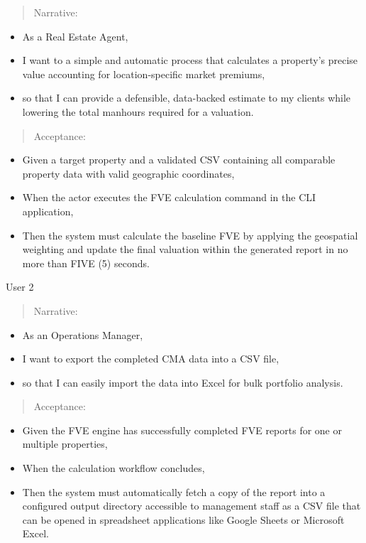 \begin{quote}
Narrative:
\end{quote}

\begin{itemize}
\item
  As a Real Estate Agent,
\item
  I want to a simple and automatic process that calculates a property's
  precise value accounting for location-specific market premiums,
\item
  so that I can provide a defensible, data-backed estimate to my clients
  while lowering the total manhours required for a valuation.
\end{itemize}

\begin{quote}
Acceptance:
\end{quote}

\begin{itemize}
\item
  Given a target property and a validated CSV containing all comparable
  property data with valid geographic coordinates,
\item
  When the actor executes the FVE calculation command in the CLI
  application,
\item
  Then the system must calculate the baseline FVE by applying the
  geospatial weighting and update the final valuation within the
  generated report in no more than FIVE (5) seconds.
\end{itemize}

User 2

\begin{quote}
Narrative:
\end{quote}

\begin{itemize}
\item
  As an Operations Manager,
\item
  I want to export the completed CMA data into a CSV file,
\item
  so that I can easily import the data into Excel for bulk portfolio
  analysis.
\end{itemize}

\begin{quote}
Acceptance:
\end{quote}

\begin{itemize}
\item
  Given the FVE engine has successfully completed FVE reports for one or
  multiple properties,
\item
  When the calculation workflow concludes,
\item
  Then the system must automatically fetch a copy of the report into a
  configured output directory accessible to management staff as a CSV
  file that can be opened in spreadsheet applications like Google Sheets
  or Microsoft Excel.
\end{itemize}

